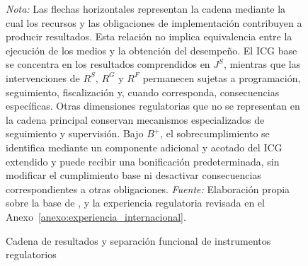 \begin{figure}[t]

\caption{Cadena de resultados y separación funcional de instrumentos regulatorios}
\label{fig:cadena_resultados_instrumentos}

\begin{minipage}{0.97\textwidth}
\footnotesize
\textit{Nota:} Las flechas horizontales representan la cadena mediante la cual los recursos y las obligaciones de implementación contribuyen a producir resultados. Esta relación no implica equivalencia entre la ejecución de los medios y la obtención del desempeño. El ICG base se concentra en los resultados comprendidos en \(J^{S}\), mientras que las intervenciones de \(R^{S}\), \(R^{G}\) y \(R^{F}\) permanecen sujetas a programación, seguimiento, fiscalización y, cuando corresponda, consecuencias específicas. Otras dimensiones regulatorias que no se representan en la cadena principal conservan mecanismos especializados de seguimiento y supervisión. Bajo \(B^{+}\), el sobrecumplimiento se identifica mediante un componente adicional y acotado del ICG extendido y puede recibir una bonificación predeterminada, sin modificar el cumplimiento base ni desactivar consecuencias correspondientes a otras obligaciones. \textit{Fuente:} Elaboración propia sobre la base de \citet{oecd2023glossary}, \citet{behn2003measure} y la experiencia regulatoria revisada en el Anexo~\ref{anexo:experiencia_internacional}.
\end{minipage}

\end{figure}
